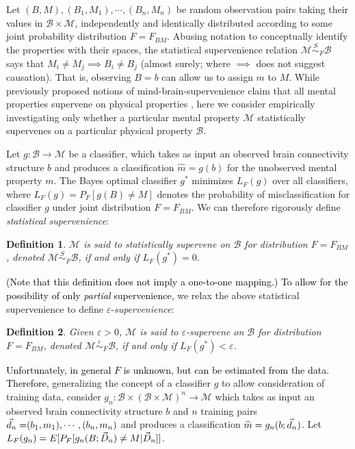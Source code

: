 \documentclass{article}
\newcommand{\mB}{\mathcal{B}}
\newcommand{\mM}{\mathcal{M}}
\newcommand{\MeB}{\mM \overset{\varepsilon}{{\sim}}_F \mB}
\providecommand{\tr}[1]{\textcolor{black}{#1}}
\newtheorem{defi}{Definition}
\begin{document}
Let $(B,M), (B_1,M_1),\cdots,(B_n,M_n)$ be random observation pairs taking their values in $\mB \times \mM$, independently and identically distributed according to some joint probability distribution $F=F_{BM}$. Abusing notation to conceptually identify the properties with their spaces, the statistical supervenience relation $\mM \overset{S}{\sim}_F \mB$ says that $M_i \neq M_j \implies B_i \neq B_j$ (almost surely; where $\implies$ does not suggest causation). That is, observing $B=b$ can allow us to assign $m$ to $M$. While previously proposed notions of mind-brain-supervenience claim that all mental properties supervene on physical properties \cite{Kim95}, here we consider empirically investigating only whether a particular mental property $\mM$ statistically supervenes on a particular physical property $\mB$.

Let $g:\mB \rightarrow \mM$ be a classifier, which takes as input an observed brain connectivity structure $b$ and produces a classification $\widehat{m}=g(b)$ for the unobserved mental property $m$. The Bayes optimal classifier $g^*$ minimizes $L_{F}(g)$ over all classifiers, where $L_{F}(g) = P_{F}[g(B) \neq M]$ denotes the probability of misclassification for classifier $g$ under joint distribution $F=F_{BM}$. We can therefore rigorously define \textit{statistical supervenience}:

\begin{defi}
\label{def1} 
$\mM$ is said to \textit{statistically supervene} on $\mB$ for distribution $F=F_{BM}$, denoted $\mM \overset{S}{\sim}_F \mB$, if and only if $L_{F}(g^*) = 0$.
\end{defi}

\tr{(Note that this definition does not imply a one-to-one mapping.)}  \tr{To allow for the possibility of only \emph{partial} supervenience,}  we relax the above statistical supervenience to define $\varepsilon$-\textit{supervenience}:

\begin{defi}
\label{def2}
Given $\varepsilon > 0$, $\mM$ is said to $\varepsilon$-\textit{supervene} on $\mB$ for distribution $F=F_{BM}$, denoted $\MeB$, if and only if $L_{F}(g^*) < \varepsilon$.
\end{defi}

\tr{Unfortunately, in general $F$ is unknown, but can be estimated from the data. Therefore,} generalizing the concept of a classifier $g$ to allow consideration of training data, consider $g_n:\mB \times (\mB \times \mM)^n \rightarrow \mM$ which takes as input an observed brain connectivity structure $b$ and $n$ training pairs $\tr{\vec{d}_n=}(b_1,m_1),\cdots,(b_n,m_n)$ and produces a classification $\widehat{m}=g_n(b;\tr{\vec{d}_n})$. Let $L_{F}(g_n) = E[P_{F}[g_n(B;\tr{\vec{D}_n}) \neq M|\tr{\vec{D}_n}]]$.
\end{document}
